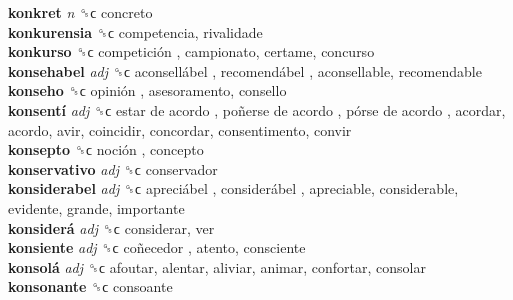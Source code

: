 \textbf{konkret} \emph{n}  ␝ϲ  concreto  \\
\textbf{konkurensia} ␝ϲ  competencia, rivalidade  \\
\textbf{konkurso} ␝ϲ   competición , campionato, certame, concurso  \\
\textbf{konsehabel} \emph{adj}  ␝ϲ   aconsellábel ,  recomendábel , aconsellable, recomendable  \\
\textbf{konseho} ␝ϲ   opinión , asesoramento, consello  \\
\textbf{konsentí} \emph{adj}  ␝ϲ   estar de acordo ,  poñerse de acordo ,  pórse de acordo , acordar, acordo, avir, coincidir, concordar, consentimento, convir  \\
\textbf{konsepto} ␝ϲ   noción , concepto  \\
\textbf{konservativo} \emph{adj}  ␝ϲ  conservador  \\
\textbf{konsiderabel} \emph{adj}  ␝ϲ   apreciábel ,  considerábel , apreciable, considerable, evidente, grande, importante  \\
\textbf{konsiderá} \emph{adj}  ␝ϲ  considerar, ver  \\
\textbf{konsiente} \emph{adj}  ␝ϲ   coñecedor , atento, consciente  \\
\textbf{konsolá} \emph{adj}  ␝ϲ  afoutar, alentar, aliviar, animar, confortar, consolar  \\
\textbf{konsonante} ␝ϲ  consoante  \\
